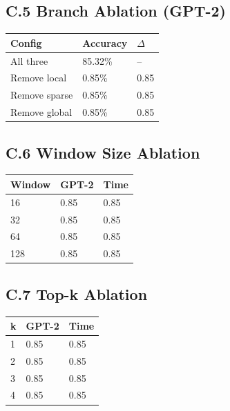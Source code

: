 \subsection{C.5 Branch Ablation (GPT-2)}

\begin{table}[H]
\centering
\small
\begin{tabular}{lll}
\toprule
\textbf{Config} & \textbf{Accuracy} & \textbf{$\Delta$} \\
\midrule
All three & 85.32\% & -- \\
Remove local & 0.85\% & 0.85 \\
Remove sparse & 0.85\% & 0.85 \\
Remove global & 0.85\% & 0.85 \\
\bottomrule
\end{tabular}
\end{table}

\subsection{C.6 Window Size Ablation}

\begin{table}[H]
\centering
\small
\begin{tabular}{lll}
\toprule
\textbf{Window} & \textbf{GPT-2} & \textbf{Time} \\
\midrule
16 & 0.85 & 0.85 \\
32 & 0.85 & 0.85 \\
64 & 0.85 & 0.85 \\
128 & 0.85 & 0.85 \\
\bottomrule
\end{tabular}
\end{table}

\subsection{C.7 Top-k Ablation}

\begin{table}[H]
\centering
\small
\begin{tabular}{lll}
\toprule
\textbf{k} & \textbf{GPT-2} & \textbf{Time} \\
\midrule
1 & 0.85 & 0.85 \\
2 & 0.85 & 0.85 \\
3 & 0.85 & 0.85 \\
4 & 0.85 & 0.85 \\
\bottomrule
\end{tabular}
\end{table}

